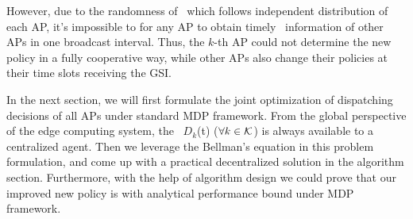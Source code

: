 However, due to the randomness of \brlatency~which follows independent distribution of each AP, it's impossible to for any AP to obtain timely \brlatency~information of other APs in one broadcast interval.
Thus, the $k$-th AP could not determine the new policy in a fully cooperative way, while other APs also change their policies at their time slots receiving the GSI.

In the next section, we will first formulate the joint optimization of dispatching decisions of all APs under standard MDP framework.
From the global perspective of the edge computing system, the \brlatency~$D_{k}$(t) ($\forall k\in\mathcal{K}$) is always available to a centralized agent.
Then we leverage the Bellman's equation in this problem formulation, and come up with a practical decentralized solution in the algorithm section. 
Furthermore, with the help of algorithm design we could prove that our improved new policy is with analytical performance bound under MDP framework.

